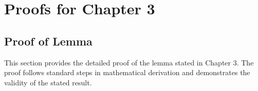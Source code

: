 \appendix
\chapter{Proofs for Chapter 3}
\label{appendix}

\section{Proof of Lemma}
\begin{paragraph}
This section provides the detailed proof of the lemma stated in Chapter 3. The proof follows standard steps in mathematical derivation and demonstrates the validity of the stated result.
\end{paragraph}

